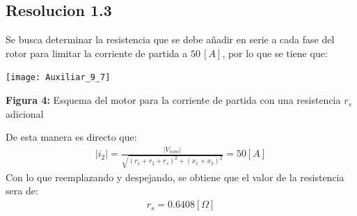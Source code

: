 \documentclass[
  11pt,
  letterpaper,
   addpoints,
   answers
  ]{exam}
\begin{document}
\begin{questions}
\begin{solution}
        \subsection*{Resolucion 1.3}
        Se busca determinar la resistencia que se debe añadir en serie a cada fase del rotor para limitar la corriente de partida a \(50 \, [A]\), por lo que se tiene que:
        \begin{center}
            \texttt{[image: Auxiliar\_9\_7]}
        \end{center}
        \begin{center}
            \textbf{Figura 4:} Esquema del motor para la corriente de partida con una resistencia $r_{s}$ adicional
        \end{center}
        De esta manera es directo que:
        \begin{align}
            |i_{2}| = \frac{|V_{nom}|}{\sqrt{(r_{1} + r_{2} + r_{s})^{2} + (x_{1} + x_{2})^{2}}} = 50[A]
        \end{align}
        Con lo que reemplazando y despejando, se obtiene que el valor de la resistencia sera de:
        \begin{align}
            r_{s} = 0.6408[\Omega]
        \end{align}

\end{solution}
\end{questions}
\end{document}
